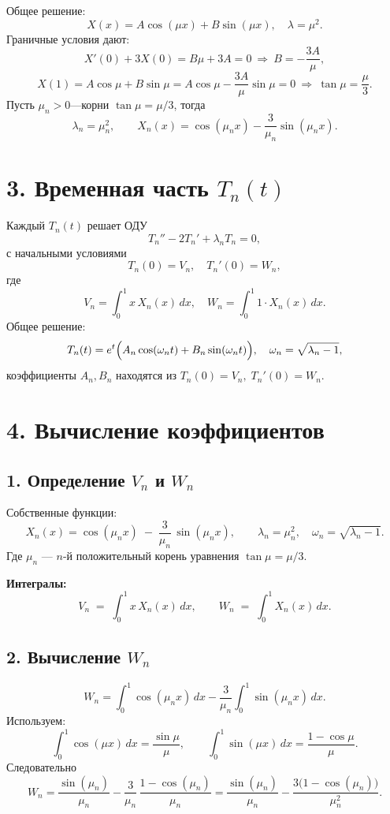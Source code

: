 \documentclass[a4paper,12pt]{article}
\begin{document}
Общее решение:
\[
X(x)=A\cos(\mu x)+B\sin(\mu x),\quad \lambda=\mu^2.
\]
Граничные условия дают:
\[
X'(0)+3X(0)=B\mu+3A=0
\ \Longrightarrow\ B=-\frac{3A}{\mu},
\]
\[
X(1)=A\cos\mu + B\sin\mu
= A\cos\mu - \frac{3A}{\mu}\sin\mu =0
\ \Longrightarrow\ \tan\mu = \frac{\mu}{3}.
\]
Пусть $\mu_n>0$—корни $\tan\mu=\mu/3$, тогда
\[
\lambda_n=\mu_n^2,\qquad
X_n(x)=\cos(\mu_n x)-\frac{3}{\mu_n}\sin(\mu_n x).
\]

\section*{3. Временная часть $T_n(t)$}

Каждый $T_n(t)$ решает ОДУ
\[
T_n'' - 2T_n' + \lambda_n T_n = 0,
\]
с начальными условиями
\[
T_n(0)=V_n,\quad T_n'(0)=W_n,
\]
где
\[
V_n=\int_{0}^{1} x\,X_n(x)\,dx,\quad
W_n=\int_{0}^{1} 1\cdot X_n(x)\,dx.
\]
Общее решение:
\[
T_n(t)
= e^{t}\Bigl(A_n\cos(\omega_n t) + B_n\sin(\omega_n t)\Bigr),
\quad \omega_n = \sqrt{\lambda_n - 1},
\]
коэффициенты $A_n,B_n$ находятся из $T_n(0)=V_n,\;T_n'(0)=W_n$.

\section*{4. Вычисление коэффициентов}

\subsection*{1. Определение $V_n$ и $W_n$}

Собственные функции:
\[
X_n(x) = \cos(\mu_n x) \;-\;\frac{3}{\mu_n}\,\sin(\mu_n x),
\qquad \lambda_n = \mu_n^2,\quad \omega_n = \sqrt{\lambda_n - 1}.
\]
Где \(\mu_n\) — \(n\)-й положительный корень уравнения \(\tan\mu=\mu/3\).

\medskip

\textbf{Интегралы:}
\[
V_n \;=\;\int_{0}^{1} x\,X_n(x)\,dx,
\qquad
W_n \;=\;\int_{0}^{1} X_n(x)\,dx.
\]

\subsection*{2. Вычисление $W_n$}

\[
W_n
= \int_{0}^{1} \cos(\mu_n x)\,dx
  - \frac{3}{\mu_n}\int_{0}^{1} \sin(\mu_n x)\,dx.
\]
Используем:
\[
\int_{0}^{1}\cos(\mu x)\,dx = \frac{\sin\mu}{\mu},
\qquad
\int_{0}^{1}\sin(\mu x)\,dx = \frac{1-\cos\mu}{\mu}.
\]
Следовательно
\[
\boxed{
W_n
= \frac{\sin(\mu_n)}{\mu_n}
- \frac{3}{\mu_n}\,\frac{1-\cos(\mu_n)}{\mu_n}
= \frac{\sin(\mu_n)}{\mu_n}
- \frac{3\bigl(1-\cos(\mu_n)\bigr)}{\mu_n^2}.
}
\]
\end{document}
